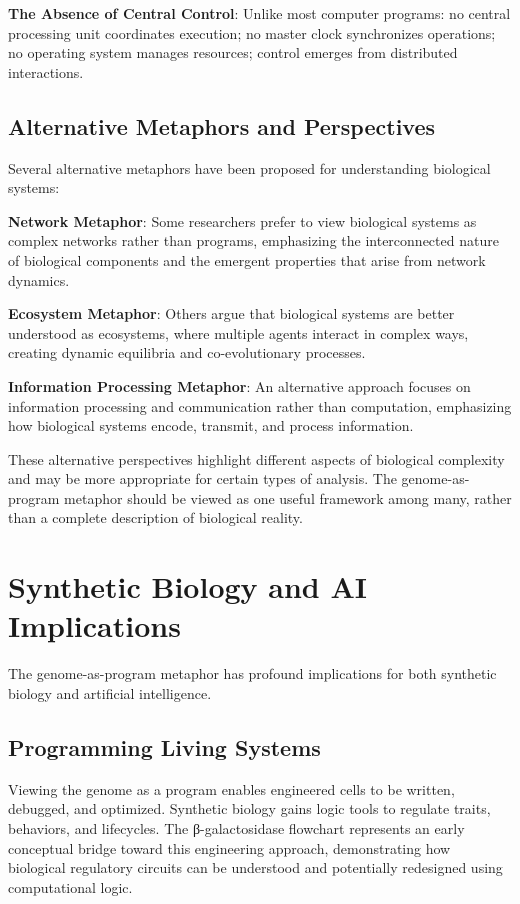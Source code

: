 \documentclass[11pt]{article}
\begin{document}
\textbf{The Absence of Central Control}: Unlike most computer programs: no central processing unit coordinates execution; no master clock synchronizes operations; no operating system manages resources; control emerges from distributed interactions.

\subsection{Alternative Metaphors and Perspectives}

Several alternative metaphors have been proposed for understanding biological systems:

\textbf{Network Metaphor}: Some researchers prefer to view biological systems as complex networks rather than programs, emphasizing the interconnected nature of biological components and the emergent properties that arise from network dynamics.

\textbf{Ecosystem Metaphor}: Others argue that biological systems are better understood as ecosystems, where multiple agents interact in complex ways, creating dynamic equilibria and co-evolutionary processes.

\textbf{Information Processing Metaphor}: An alternative approach focuses on information processing and communication rather than computation, emphasizing how biological systems encode, transmit, and process information.

These alternative perspectives highlight different aspects of biological complexity and may be more appropriate for certain types of analysis. The genome-as-program metaphor should be viewed as one useful framework among many, rather than a complete description of biological reality.

\section{Synthetic Biology and AI Implications}

The genome-as-program metaphor has profound implications for both synthetic biology and artificial intelligence.

\subsection{Programming Living Systems}

Viewing the genome as a program enables engineered cells to be written, debugged, and optimized. Synthetic biology gains logic tools to regulate traits, behaviors, and lifecycles. The β-galactosidase flowchart represents an early conceptual bridge toward this engineering approach, demonstrating how biological regulatory circuits can be understood and potentially redesigned using computational logic.
\end{document}

